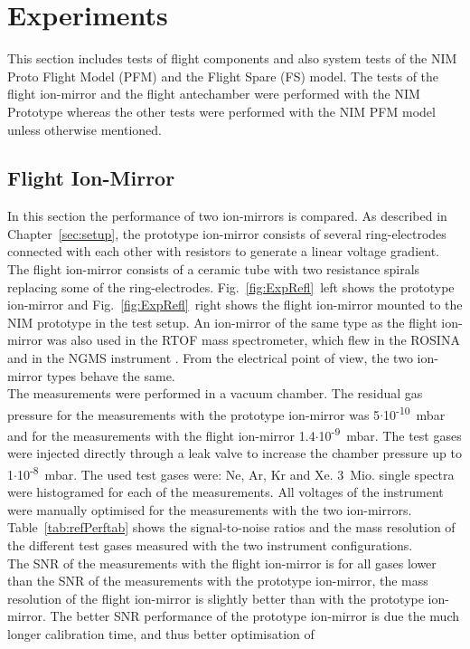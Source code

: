 \section{Experiments} \label{sec:Exp}
	
	This section includes tests of flight components and also system tests of the NIM Proto Flight Model (PFM) and the Flight Spare (FS) model. The tests of the flight ion-mirror and the flight antechamber were performed with the NIM Prototype whereas the other tests were performed with the NIM PFM model unless otherwise mentioned.

	\subsection{Flight Ion-Mirror}
	In this section the performance of two ion-mirrors is compared. As described in Chapter~\ref{sec:setup}, the prototype ion-mirror consists of several ring-electrodes connected with each other with resistors to generate a linear voltage gradient. The flight ion-mirror consists of a ceramic tube with two resistance spirals replacing some of the ring-electrodes. Fig.~\ref{fig:ExpRefl}~left shows the prototype ion-mirror and Fig.~\ref{fig:ExpRefl}~right shows the flight ion-mirror mounted to the NIM prototype in the test setup. An ion-mirror of the same type as the flight ion-mirror was also used in the RTOF mass spectrometer, which flew in the ROSINA \cite{Diss_Scherer} and in the NGMS instrument \cite{Diss_Hofer}. From the electrical point of view, the two ion-mirror types behave the same.\\
	The measurements were performed in a vacuum chamber. The residual gas pressure for the measurements with the prototype ion-mirror was 5$\cdot$10\textsuperscript{-10}~mbar and for the measurements with the flight ion-mirror 1.4$\cdot$10\textsuperscript{-9}~mbar. The test gases were injected directly through a leak valve to increase the chamber pressure up to 1$\cdot$10\textsuperscript{-8}~mbar. The used test gases were: Ne, Ar, Kr and Xe. 3~Mio. single spectra were histogramed for each of the measurements. All voltages of the instrument were manually optimised for the measurements with the two ion-mirrors. Table~\ref{tab:refPerftab} shows the signal-to-noise ratios and the mass resolution of the different test gases measured with the two instrument configurations.\\
	The SNR of the measurements with the flight ion-mirror is for all gases lower than the SNR of the measurements with the prototype ion-mirror, the mass resolution of the flight ion-mirror is slightly better than with the prototype ion-mirror. The better SNR performance of the prototype ion-mirror is due the much longer calibration time, and thus better optimisation of
